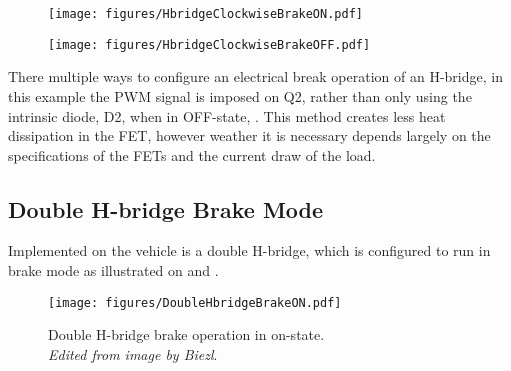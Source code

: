   \begin{minipage}{\linewidth}
  	\begin{minipage}{0.45\linewidth}
  		\begin{figure}[H]
  			\texttt{[image: figures/HbridgeClockwiseBrakeON.pdf]}
  			\centering
  			\vspace{-.4cm}
  			\captionsetup{justification=centering}
  			\label{HbridgeClockwiseBrakeON}
  		\end{figure}\vspace{-5mm}
  	\end{minipage}
  	\hspace{0.03\linewidth}
  	\begin{minipage}{0.45\linewidth}
  		\begin{figure}[H]
  			\texttt{[image: figures/HbridgeClockwiseBrakeOFF.pdf]}
  			\centering
  			\vspace{-.4cm}
  			\captionsetup{justification=centering}
  			\label{HbridgeClockwiseBrakeOFF}
  		\end{figure}\vspace{-5mm}
  	\end{minipage}
  \end{minipage}

There multiple ways to configure an electrical break operation of an H-bridge, in this example the PWM signal is imposed on Q2, rather than only using the intrinsic diode, D2, when in OFF-state,  \cite{DCook}. This method creates less heat dissipation in the FET, however weather it is necessary depends largely on the specifications of the FETs and the current draw of the load.

\subsection{Double H-bridge Brake Mode}
Implemented on the vehicle is a double H-bridge, which is configured to run in brake mode as illustrated on  and . 

\begin{figure}[H]
	\centering
	\texttt{[image: figures/DoubleHbridgeBrakeON.pdf]}
	\caption{Double H-bridge brake operation in on-state.\\ \emph{Edited from image by Biezl}.\cite{Biezl}}
	\label{DoubleHbridgeBrakeON}
\end{figure}\vspace{-5mm}

